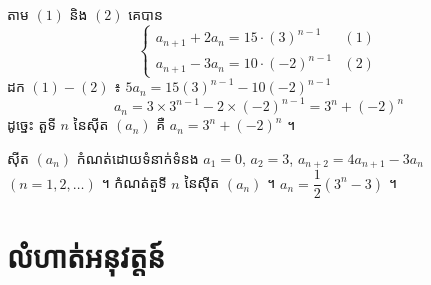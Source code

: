 តាម $(1)$ និង $(2)$ គេបាន
\[
\begin{cases}
a_{n+1} + 2a_n = 15 \cdot (3)^{n-1} & (1)\\
a_{n+1} - 3a_n = 10 \cdot (-2)^{n-1} & (2)
\end{cases}
\]
ដក $(1) - (2)$ ៖ $5a_n = 15(3)^{n-1} - 10(-2)^{n-1}$
\[ a_n = 3 \times 3^{n-1} - 2 \times (-2)^{n-1} = 3^n + (-2)^n \]
ដូច្នេះ តួទី $n$ នៃស៊ីត $(a_n)$ គឺ $a_n = 3^n + (-2)^n$ ។

\begin{pro}
ស៊ីត $(a_n)$ កំណត់ដោយទំនាក់ទំនង $a_1 = 0$, $a_2 = 3$, $a_{n+2} = 4a_{n+1} - 3a_n$ $(n = 1, 2, \ldots)$ ។ កំណត់តួទី $n$ នៃស៊ីត $(a_n)$ ។
\ans
$a_n = \dfrac{1}{2}(3^n - 3)$ ។
\end{pro}

\section*{លំហាត់អនុវត្តន៍}
